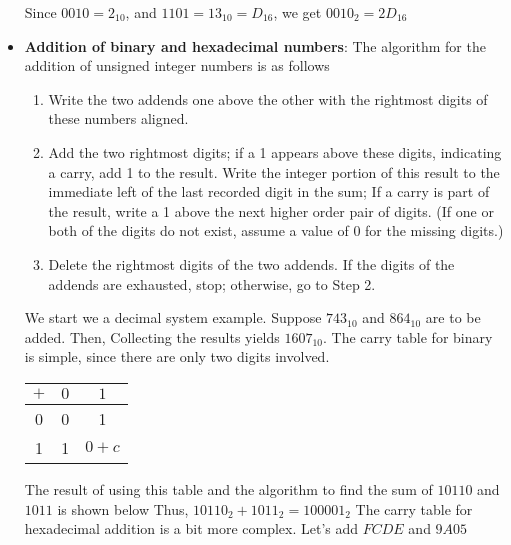 \documentclass{report}
\begin{document}
\begin{itemize}
            Since $0010 =2_{10}$, and $1101 = 13_{10} = D_{16}$, we get $0010_{2} = 2D_{16} $
        \item \textbf{Addition of binary and hexadecimal numbers}: The algorithm for the addition of unsigned integer numbers is as follows
            \begin{enumerate}
                \item Write the two addends one above the other with the rightmost digits of these numbers aligned.
                \item Add the two rightmost digits; if a 1 appears above these digits, indicating a carry, add 1 to the result. Write the integer portion of this result to the immediate left of the last recorded digit in the sum; If a carry is part of the result, write a 1 above the next higher order pair of digits. (If one or both of the digits do not exist, assume a value of 0 for the missing digits.)
                \item Delete the rightmost digits of the two addends. If the digits of the addends are exhausted, stop; otherwise, go to Step 2.
            \end{enumerate}
            We start we a decimal system example. Suppose $743_{10}$ and  $864_{10}$ are to be added. Then,
            \bigbreak \noindent 
            \bigbreak \noindent 
            Collecting the results yields $1607_{10}$. The carry table for binary is simple, since there are only two digits involved.
            \begin{center}
                \begin{tabular}{c|c|c}
                    $+$ & $0$ & $1$ \\
                    \hline
                    0 & 0 & 1 \\
                    \hline
                    1 & 1 & $0+c$
                \end{tabular}
            \end{center}
            The result of using this table and the algorithm to find the sum of $10110$ and $1011$ is shown below
            \bigbreak \noindent 
            \bigbreak \noindent 
            Thus, $10110_{2} + 1011_{2} = 100001_{2} $
            \bigbreak \noindent 
            The carry table for hexadecimal addition is a bit more complex.
            \bigbreak \noindent 
            \bigbreak \noindent 
            Let's add $FCDE$ and $9A05 $
            \bigbreak \noindent 

\end{itemize}
\end{document}
